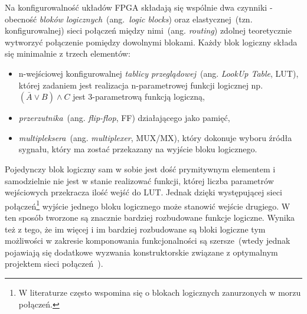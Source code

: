Na konfigurowalność układów FPGA składają się wspólnie dwa czynniki - obecność \textit{bloków logicznych}~(ang.~\textit{logic blocks}) oraz elastycznej~(tzn. konfigurowalnej) sieci połączeń między nimi~(ang. \textit{routing}) zdolnej teoretycznie wytworzyć połączenie pomiędzy dowolnymi blokami.
Każdy blok logiczny składa się minimalnie z trzech elementów:
\begin{itemize}
\item n-wejściowej konfigurowalnej \textit{tablicy przeglądowej}~(ang. \textit{LookUp Table}, LUT), której zadaniem jest realizacja n-parametrowej funkcji logicznej np. $(\bar{A}\vee B) \wedge C$ jest 3-parametrową funkcją logiczną,
\item \textit{przerzutnika}~(ang. \textit{flip-flop}, FF) działającego jako pamięć,
\item \textit{multipleksera}~(ang. \textit{multiplexer}, MUX/MX), który dokonuje wyboru źródła sygnału, który ma zostać przekazany na wyjście bloku logicznego.
\end{itemize}
Pojedynczy blok logiczny sam w sobie jest dość prymitywnym elementem i samodzielnie nie jest w stanie realizować funkcji, której liczba parametrów wejściowych przekracza ilość wejść do LUT. Jednak dzięki występującej sieci połączeń\footnote{W literaturze często wspomina się o blokach logicznych zanurzonych w morzu połączeń.} wyjście jednego bloku logicznego może stanowić wejście drugiego. W ten sposób tworzone są znacznie bardziej rozbudowane funkcje logiczne. Wynika też z tego, że im więcej i im bardziej rozbudowane są bloki logiczne tym możliwości w zakresie komponowania funkcjonalności są szersze~(wtedy jednak pojawiają się dodatkowe wyzwania konstruktorskie związane z optymalnym projektem sieci połączeń~\cite{FPGA_ARCHITECTURE}).
